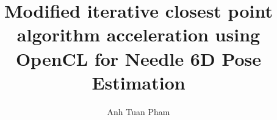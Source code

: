 \documentclass[11pt,a4paper,footexclude,headsepline,footsepline,BCOR12mm,DIV13]{scrbook}
\author{Anh Tuan Pham}
\title{Modified iterative closest point algorithm acceleration using OpenCL for Needle 6D Pose Estimation}
\begin{document}

\cleardoublepage




\tableofcontents{}





\newpage


\end{document}
